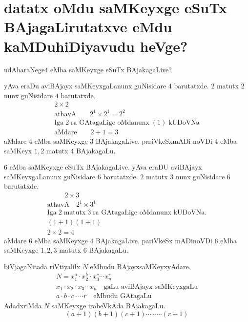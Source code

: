 \chapter{{\bf datatx oMdu saMKeyxge eSuTx BAjagaLirutatxve eMdu kaMDuhiDiyavudu heVge?}}


udAharaNege\quad $4$ eMba saMKeyxge eSuTx BAjakagaLive?

yAva eraDu aviBAjayx saMKeyxgaLanunx guNisidare $4$ barutatxde. $2$ matutx $2$ nunx guNisidare $4$ barutatxde.
\begin{gather*}
2\times 2\\
\text{athavA} \qquad 2^1\times 2^1 = 2^2\\
\text{Iga}\; 2 \;\text{ra GAtagaLige oMdanunx} \;(1)\; \text{kUDoVNa}\\
\text{aMdare}\qquad 2+1 =3
\end{gather*}
aMdare $4$ eMba saMKeyxge $3$ BAjakagaLive. pariVkeSxmADi noVDi $4$ eMba saMKeyx $1,2$ matutx $4$ BAjakagaLu. 


$6$ eMba saMKeyxge eSuTx BAjakagaLive. yAva eraDU aviBAjayx saMKeyxgaLanunx guNisidare $6$ barutatxde.
$2$ matutx $3$ nunx guNisidare $6$ barutatxde.
\begin{gather*}
\qquad\;\; 2 \times 3\\
\text{athavA}\quad 2^1 \times 3^1\\
\text{Iga} \;2\; \text{matutx} \;3\; \text{ra GAtagaLige oMdanunx kUDoVNa.}\\
(1+1)(1+1)\\
2\times 2 =4 
\end{gather*}
aMdare $6$ eMba saMKeyxge $4$ BAjakagaLive. pariVkeSx mADinoVDi $6$ eMba saMKeyxge $1,2,3$ matutx $6$ BAjakagaLu.

biVjagaNitada riVtiyalilx $N$ eMbudu BAjayxsaMKeyxyAdare.
\begin{gather*}
N=x_1^a \cdot x_2^b\cdot x_3^c \cdots x_n^r\\
x_1\cdot x_2\cdot x_3 \cdots x_n \quad\text{gaLu aviBAjayx saMKeyxgaLu}\\
a \cdot b\cdot c\cdot \cdots r \quad\text{eMbudu GAtagaLu}
\end{gather*}
AdadxriMda $N$ saMKeyxge irabeVkAda BAjakagaLu.
$$
(a+1)(b+1)(c+1)\cdots\cdots\cdots(r+1)
$$
